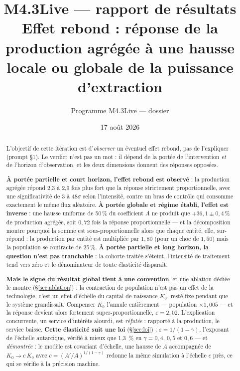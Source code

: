 \documentclass[11pt,a4paper]{article}
\title{M4.3Live --- rapport de résultats\\
\large Effet rebond : réponse de la production agrégée à une hausse
locale ou globale de la puissance d'extraction}
\author{Programme M4.3Live --- dossier \code{m4\_3live\_credit\_soc}}
\date{17 août 2026}
\begin{document}
\maketitle

\begin{abstract}
L'objectif de cette itération est d'\emph{observer} un éventuel effet
rebond, pas de l'expliquer (prompt §1). Le verdict n'est pas un mot : il
dépend de la portée de l'intervention \emph{et} de l'horizon
d'observation, et les deux dimensions donnent des réponses opposées.

\textbf{À portée partielle et court horizon, l'effet rebond est
observé} : la production agrégée répond 2,3 à 2,9 fois plus fort que la
réponse strictement proportionnelle, avec une significativité de 3 à
48$\sigma$ selon l'intensité, contre un bras de contrôle qui consomme
exactement le même flux aléatoire. \textbf{À portée globale et régime établi, l'effet est
inverse} : une hausse uniforme de 50\,\% du coefficient $A$ ne produit que
$+36{,}1 \pm 0{,}4$\,\% de production agrégée, soit $0{,}72$ fois la
réponse proportionnelle --- et la décomposition montre pourquoi la
somme est sous-proportionnelle alors que chaque entité, elle,
sur-répond : la production par entité est multipliée par $1{,}80$ (pour
un choc de $1{,}50$) mais la population se contracte de 25\,\%.
\textbf{À portée partielle et long horizon, la question n'est pas
tranchable} : la cohorte traitée s'éteint, l'intensité de traitement tend
vers zéro et le dénominateur de toute élasticité disparaît.

\textbf{Mais le signe du résultat global tient à une convention}, et une
ablation dédiée le montre (§\ref{sec:ablation}) : la contraction de
population n'est pas un effet de la technologie, c'est un effet d'échelle du
capital de naissance $K_0$, resté fixe pendant que le système grandissait.
Compenser $K_0$ l'annule entièrement --- population $\times1{,}005$ --- et
la réponse devient alors fortement super-proportionnelle,
$\varepsilon = 2{,}02$. L'explication concurrente, un service d'intérêts
alourdi, est \emph{réfutée} : rapporté à la production, le service baisse.
\textbf{Cette élasticité suit une loi} (§\ref{sec:loi}) :
$\varepsilon = 1/(1-\gamma)$, l'exposant de l'échelle autarcique, vérifié à
mieux que 1,3~\% en $\gamma = 0{,}4$, $0{,}5$ et $0{,}6$ --- et
\emph{démontrée} : le modèle est covariant d'échelle, une hausse de $A$
accompagnée de $K_0 \to c\,K_0$ avec $c = (A'/A)^{1/(1-\gamma)}$ redonne la
même simulation à l'échelle $c$ près, ce qui se vérifie à la précision
machine.


\end{abstract}
\end{document}
